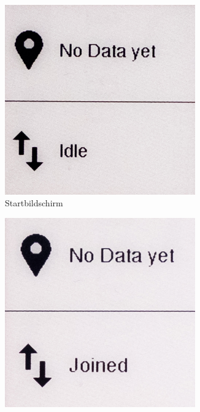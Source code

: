 \documentclass[11pt,english,german]{report}
\theoremstyle{definition}
\begin{document}
\begin{figure}[H]
	\centering
	\begin{subfigure}{.33\textwidth}
		\centering
		\includegraphics[width=0.9\textwidth]{img/prototype/dashboard_idle.jpg}
		\caption[Bildschrim - Start]
		{Startbildschirm}
	\end{subfigure}%
	\begin{subfigure}{.33\textwidth}
		\centering
		\includegraphics[width=0.9\textwidth]{img/prototype/dashboard_joined.jpg}

\end{subfigure}
\end{figure}
\end{document}
